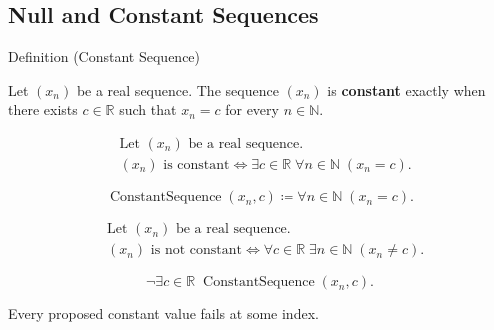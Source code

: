\subsection*{Null and Constant Sequences}


\begin{definitionbox}{Definition (Constant Sequence)}
\begin{definition}
\label{def:constant-sequence}
Let $(x_n)$ be a real sequence. The sequence $(x_n)$ is
\textbf{constant} exactly when there exists $c \in \mathbb{R}$ such that
$x_n = c$ for every $n \in \mathbb{N}$.
\end{definition}
\end{definitionbox}

\begin{remark*}
\[
\begin{aligned}
&\text{Let } (x_n) \text{ be a real sequence.}\\
&(x_n) \text{ is constant}
\Longleftrightarrow
\exists c \in \mathbb{R}\;
\forall n \in \mathbb{N}\;(x_n = c).
\end{aligned}
\]
\end{remark*}

\begin{remark*}
\[
\operatorname{ConstantSequence}(x_n,c)
\coloneqq
\forall n \in \mathbb{N}\;(x_n = c).
\]
\end{remark*}

\begin{remark*}
\[
\begin{aligned}
&\text{Let } (x_n) \text{ be a real sequence.}\\
&(x_n) \text{ is not constant}
\Longleftrightarrow
\forall c \in \mathbb{R}\;
\exists n \in \mathbb{N}\;(x_n \neq c).
\end{aligned}
\]
\end{remark*}

\begin{remark*}
\[
\neg\exists c \in \mathbb{R}\;
\operatorname{ConstantSequence}(x_n,c).
\]
\end{remark*}

\begin{remark*}
Every proposed constant value fails at some index.
\end{remark*}


